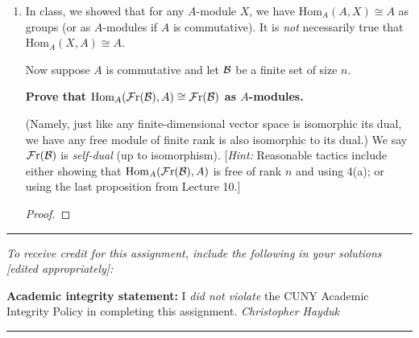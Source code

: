 \documentclass[11pt, reqno]{amsart}
\theoremstyle{plain}
\theoremstyle{definition}
\theoremstyle{example}
\def\End{\mathrm{End}}
\def\Hom{\mathrm{Hom}}
\def\Fr{\mathcal{F}\mathrm{r}}
\begin{document}
\begin{enumerate}[1.]
\begin{enumerate}
\begin{enumerate}[(i)]
\begin{proof}
Thus, we have $\psi_1 \varphi_1 + \psi_2 \varphi_2 = 1$. Hence, $\varphi_1$ and $\varphi_2$ are independent and span $\End_{\ZZ}(M)$. Hence $\{\varphi_1, \varphi_2\}$ is a free basis of the left regular module of $A$.
\end{proof}
	
\item Use the previous part to \textbf{prove that $A \cong A^2$ as $A$-modules}. Deduce that $A \cong A^n$ as $A$-modules for all $n \in \ZZ_{>0}$. 

\begin{proof}
We have that $A = A1$ as an $A$-module and $A^2 = A\{\varphi_1, \varphi_2\}$ as an $A$-module. But $1$ and $\{\varphi_1, \varphi_2\}$ are both free bases for the left regular module, and so $A \cong A^2$ as $A$-modules.
\end{proof}
\end{enumerate}

\end{enumerate}
\item In class, we showed that for any $A$-module $X$, we have $\Hom_A(A,X) \cong A$ as groups (or as $A$-modules if $A$ is commutative). It is \emph{not} necessarily true that $\Hom_A(X,A) \cong A$. 

\medskip

Now  suppose $A$ is commutative and let $\mathcal{B}$ be a finite set of size $n$. 

\smallskip
\centerline{\textbf{Prove that $\Hom_A(\Fr(\cB), A) \cong \Fr(\cB)$ as $A$-modules.}} (Namely,  just like any finite-dimensional vector space is isomorphic its dual, we have any free module of finite rank is also isomorphic to its dual.) We say $\Fr(\cB)$ is \emph{self-dual} (up to isomorphism). {[\emph{Hint:} Reasonable tactics include either showing that $\Hom_A(\Fr(\cB), A)$ is free  of rank $n$ and using 4(a); or using the last proposition from Lecture 10.]}

\begin{proof}

\end{proof}

\end{enumerate}

\vfill


\hrule
\emph{\small To receive credit for this assignment, include the following in your solutions [edited appropriately]:}

\smallskip

\textbf{Academic integrity statement:} I \emph{did not violate} the CUNY Academic Integrity Policy in completing this assignment. \hfill \emph{Christopher Hayduk}

\medskip
\hrule

\vfill
\end{document}
